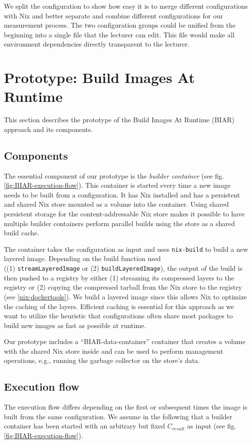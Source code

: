 We split the configuration to show how easy it is to merge different configurations with Nix and better separate and combine different configurations for our measurement process. The two configuration groups could be unified from the beginning into a single file that the lecturer can edit. This file would make all environment dependencies directly transparent to the lecturer.
\section{Prototype: Build Images At Runtime}
This section describes the prototype of the Build Images At Runtime (BIAR) approach and its components.
\subsection{Components}\label{BIAR-components}
The essential component of our prototype is the \emph{builder container} (see fig. \ref{fig:BIAR-execution-flow}). This container is started every time a new image needs to be built from a configuration. It has Nix installed and has a persistent and shared Nix store mounted as a volume into the container. Using shared persistent storage for the content-addressable Nix store makes it possible to have multiple builder containers perform parallel builds using the store as a shared build cache. 

The container takes the configuration as input and uses \verb|nix-build| to build a new layered image. Depending on the build function used \\((1) \verb|streamLayeredImage| or (2) \verb|buildLayeredImage|), the output of the build is then pushed to a registry by either (1) streaming its compressed layers to the registry or (2) copying the compressed tarball from the Nix store to the registry (see \ref{nix-dockertools}). We build a layered image since this allows Nix to optimize the caching of the layers. Efficient caching is essential for this approach as we want to utilize the heuristic that configurations often share most packages to build new images as fast as possible at runtime. 

Our prototype includes a ``BIAR-data-container'' container that creates a volume with the shared Nix store inside and can be used to perform management operations, e.g., running the garbage collector on the store's data.
\subsection{Execution flow}\label{BIAR-execution-flow}
The execution flow differs depending on the first or subsequent times the image is built from the same configuration. We assume in the following that a builder container has been started with an arbitrary but fixed $C_{result}$ as input (see fig. \ref{fig:BIAR-execution-flow}).

